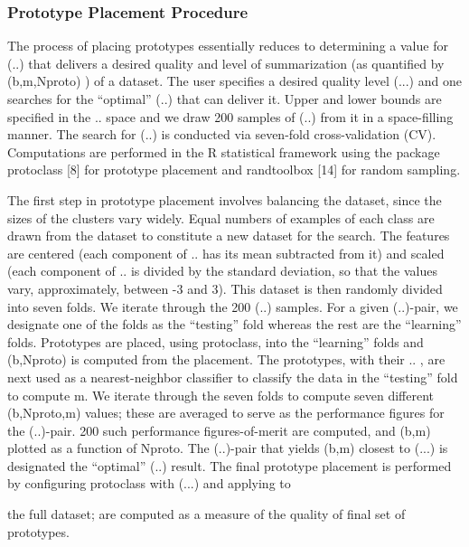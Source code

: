 \subsubsection{Prototype Placement Procedure}

The process of placing prototypes essentially reduces to determining a value for (..) that delivers a
desired quality and level of summarization (as quantiﬁed by (b,m,Nproto) ) of a dataset. The user speciﬁes a desired quality level (...) and one searches for the “optimal” (..) that can deliver it. Upper and
lower bounds are speciﬁed in the .. space and we draw 200 samples of (..) from it in a space-ﬁlling
manner. The search for (..) is conducted via seven-fold cross-validation (CV). Computations are
performed in the R statistical framework using the package protoclass [8] for prototype placement and
randtoolbox [14] for random sampling.

The ﬁrst step in prototype placement involves balancing the dataset, since the sizes of the clusters vary
widely. Equal numbers of examples of each class are drawn from the dataset to constitute a new dataset for
the search. The features are centered (each component of .. has its mean subtracted from it) and scaled
(each component of .. is divided by the standard deviation, so that the values vary, approximately, between
-3 and 3). This dataset is then randomly divided into seven folds. We iterate through the 200 (..)
samples. For a given (..)-pair, we designate one of the folds as the “testing” fold whereas the rest are the
“learning” folds. Prototypes are placed, using protoclass, into the “learning” folds and (b,Nproto) is
computed from the placement. The prototypes, with their .. , are next used as a nearest-neighbor classiﬁer
to classify the data in the “testing” fold to compute m. We iterate through the seven folds to compute seven
different (b,Nproto,m) values; these are averaged to serve as the performance ﬁgures for the (..)-pair.
200 such performance ﬁgures-of-merit are computed, and (b,m) plotted as a function of Nproto. The
(..)-pair that yields (b,m) closest to (...) is designated the “optimal” (..) result.
The ﬁnal prototype placement is performed by conﬁguring protoclass with (...) and applying to

the full dataset; are computed as a measure of the quality of ﬁnal set of prototypes.

